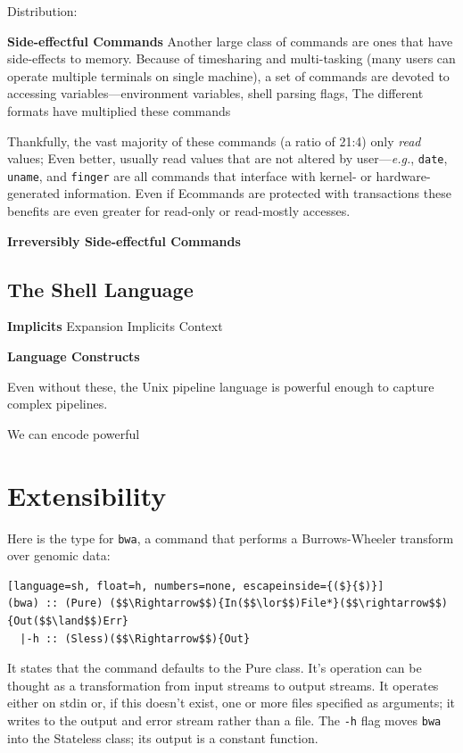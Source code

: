 \documentclass[sigplan,10pt,review,anonymous]{acmart}
\newcommand{\eg}{{\em e.g.}, }
\newcommand{\heading}[1]{\vspace{4pt}\noindent\textbf{#1}\enspace}
\newcommand{\ttt}[1]{\texttt{\small #1}}
\newcommand{\cn}[1]{\mbox{\textcircled{\footnotesize #1}}}
\newcommand{\sid}{\cn{\textsc{E}}}
\begin{document}
Distribution:

\heading{Side-effectful Commands}
Another large class of commands are ones that have side-effects to memory.
Because of timesharing and multi-tasking (many users can operate multiple terminals on single \unix machine), a set of commands are devoted to accessing variables---environment variables, shell parsing flags, 
The different formats have multiplied these commands

Thankfully, the vast majority of these commands (a ratio of 21:4) only \emph{read} values;
Even better,  usually read values that are not altered by user---\eg \ttt{date}, \ttt{uname}, and \ttt{finger} are all commands that interface with kernel- or hardware-generated information.
Even if \sid commands are protected with transactions
these benefits are even greater for read-only or read-mostly accesses.

\heading{Irreversibly Side-effectful Commands}

\subsection{The Shell Language}
\label{bg:shell}

\heading{Implicits}
Expansion
Implicits
Context

\heading{Language Constructs}

Even without these, the Unix pipeline language is powerful enough to capture complex pipelines.

We can encode powerful

\section{Extensibility}
\label{ext}

Here is the type for \ttt{bwa}, a command that performs a Burrows-Wheeler transform over genomic data:
\begin{lstlisting}[language=sh, float=h, numbers=none, escapeinside={($}{$)}]
(bwa) :: (Pure) ($$\Rightarrow$$){In($$\lor$$)File*}($$\rightarrow$$){Out($$\land$$)Err}
  |-h :: (Sless)($$\Rightarrow$$){Out}                              
\end{lstlisting}

It states that the command defaults to the Pure class.
It's operation can be thought as a transformation from input streams to output streams.
It operates either on stdin or, if this doesn't exist, one or more files specified as arguments;
  it writes to the output and error stream rather than a file.
The \ttt{-h} flag moves \ttt{bwa} into the Stateless class;
  its output is a constant function.
\end{document}

